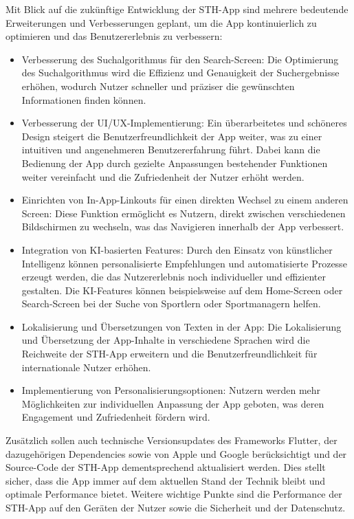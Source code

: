 Mit Blick auf die zukünftige Entwicklung der STH-App sind mehrere bedeutende Erweiterungen und Verbesserungen geplant, um die App kontinuierlich zu optimieren und das Benutzererlebnis zu verbessern:

\begin{itemize}
\item Verbesserung des Suchalgorithmus für den Search-Screen: Die Optimierung des Suchalgorithmus wird die Effizienz und Genauigkeit der Suchergebnisse erhöhen, wodurch Nutzer schneller und präziser die gewünschten Informationen finden können.
\item Verbesserung der UI/UX-Implementierung: Ein überarbeitetes und schöneres Design steigert die Benutzerfreundlichkeit der App weiter, was zu einer intuitiven und angenehmeren Benutzererfahrung führt. Dabei kann die Bedienung der App durch gezielte Anpassungen bestehender Funktionen weiter vereinfacht und die Zufriedenheit der Nutzer erhöht werden.
\item Einrichten von In-App-Linkouts für einen direkten Wechsel zu einem anderen Screen: Diese Funktion ermöglicht es Nutzern, direkt zwischen verschiedenen Bildschirmen zu wechseln, was das Navigieren innerhalb der App verbessert.
\item Integration von KI-basierten Features: Durch den Einsatz von künstlicher Intelligenz können personalisierte Empfehlungen und automatisierte Prozesse erzeugt werden, die das Nutzererlebnis noch individueller und effizienter gestalten. Die KI-Features können beispielsweise auf dem Home-Screen oder Search-Screen bei der Suche von Sportlern oder Sportmanagern helfen.
\item Lokalisierung und Übersetzungen von Texten in der App: Die Lokalisierung und Übersetzung der App-Inhalte in verschiedene Sprachen wird die Reichweite der STH-App erweitern und die Benutzerfreundlichkeit für internationale Nutzer erhöhen.
\item Implementierung von Personalisierungsoptionen: Nutzern werden mehr Möglichkeiten zur individuellen Anpassung der App geboten, was deren Engagement und Zufriedenheit fördern wird.
\end{itemize}
Zusätzlich sollen auch technische Versionsupdates des Frameworks Flutter, der dazugehörigen Dependencies sowie von Apple und Google berücksichtigt und der Source-Code der STH-App dementsprechend aktualisiert werden. Dies stellt sicher, dass die App immer auf dem aktuellen Stand der Technik bleibt und optimale Performance bietet.
Weitere wichtige Punkte sind die Performance der STH-App auf den Geräten der Nutzer sowie die Sicherheit und der Datenschutz. 
